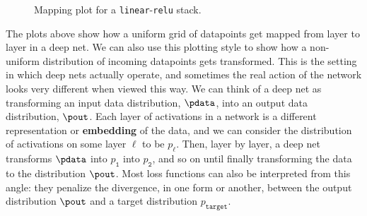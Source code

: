 \begin{figure}[h]
{
}
\caption{Mapping plot for a \texttt{linear}-\texttt{relu} stack.}
\end{figure}


The plots above show how a uniform grid of datapoints get mapped from layer to layer in a deep net. We can also use this plotting style to show how a non-uniform distribution of incoming datapoints gets transformed. This is the setting in which deep nets actually operate, and sometimes the real action of the network looks very different when viewed this way. We can think of a deep net as transforming an input data distribution, $\pdata$, into an output data distribution, $\pout$. Each layer of activations in a network is a different representation or {\bf embedding} of the data, and we can consider the distribution of activations on some layer $\ell$ to be $p_{\ell}$. Then, layer by layer, a deep net transforms $\pdata$ into $p_{\texttt{1}}$ into $p_{\texttt{2}}$, and so on until finally transforming the data to the distribution $\pout$. Most loss functions can also be interpreted from this angle: they penalize the divergence, in one form or another, between the output distribution $\pout$ and a target distribution $p_{\texttt{target}}$.

